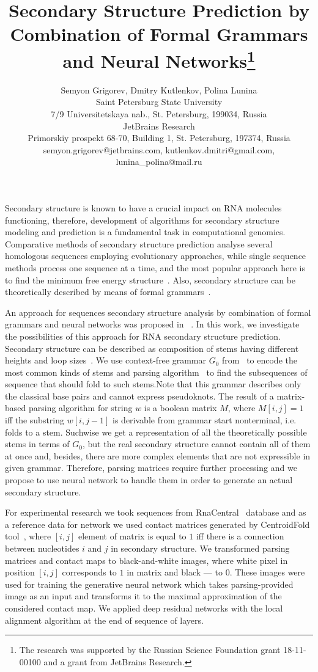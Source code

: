 \documentclass[12pt]{article}  %
\title{Secondary Structure Prediction by Combination of Formal Grammars and Neural Networks\footnote{The research was supported by the Russian Science Foundation grant 18-11-00100 and a grant from JetBrains Research.}}
\author{Semyon Grigorev, Dmitry Kutlenkov, Polina Lunina
\\ 
       \small{Saint Petersburg State University}\\
       \small{7/9 Universitetskaya nab., St. Petersburg, 199034, Russia}\\
       \small{JetBrains Research}\\
       \small{Primorskiy prospekt 68-70, Building 1, St. Petersburg, 197374, Russia} \\
       \small{semyon.grigorev@jetbrains.com, kutlenkov.dmitri@gmail.com, lunina\_polina@mail.ru}
       }
\date{}
\theoremstyle{definition}
\theoremstyle{remark}
\begin{document}
\maketitle
Secondary structure is known to have a crucial impact on RNA molecules functioning, therefore, development of algorithms for secondary structure modeling and prediction is a fundamental task in computational genomics. Comparative methods of secondary structure prediction analyse several homologous sequences employing evolutionary approaches, while single sequence methods process one sequence at a time, and the most popular approach here is to find the minimum free energy structure~\cite{hofacker1994fast,hamada2009prediction}. Also, secondary structure can be theoretically described by means of formal grammars~\cite{dowell2004evaluation,knudsen1999rna}.


An approach for sequences secondary structure analysis by combination of formal grammars and neural networks was proposed in ~\cite{grigorev2019composition,improved}. In this work, we investigate the possibilities of this approach for RNA secondary structure prediction. Secondary structure can be described as composition of stems having different heights and loop sizes~\cite{MQbioinformatics19}. We use context-free grammar $G_0$ from~\cite{grigorev2019composition,improved} to encode the most common kinds of stems and parsing algorithm~\cite{Azimov:2018:CPQ:3210259.3210264} to find the subsequences of sequence that should fold to such stems.Note that this grammar describes only the classical base pairs and cannot express pseudoknots. The result of a matrix-based parsing algorithm for string $w$ is a boolean matrix $M$, where $M[i,j] = 1$ iff the substring $w[i,j-1]$ is derivable from grammar start nonterminal, i.e. folds to a stem. Suchwise we get a representation of all the theoretically possible stems in terms of $G_0$, but the real secondary structure cannot contain all of them at once and, besides, there are more complex elements that are not expressible in given grammar. Therefore, parsing matrices require further processing and we propose to use neural network to handle them in order to generate an actual secondary structure. 

For experimental research we took sequences from RnaCentral~\cite{rnacentral} database and as a reference data for network we used contact matrices generated by CentroidFold tool~\cite{hamada2009prediction}, where $[i,j]$ element of matrix is equal to $1$ iff there is a connection between nucleotides $i$ and $j$ in secondary structure. We transformed parsing matrices and contact maps to black-and-white images, where white pixel in position $[i,j]$ corresponds to $1$ in matrix and black --- to $0$. These images were used for training the generative neural network which takes parsing-provided image as an input and transforms it to the maximal approximation of the considered contact map. We applied deep residual networks with the local alignment algorithm at the end of sequence of layers.
\end{document}
